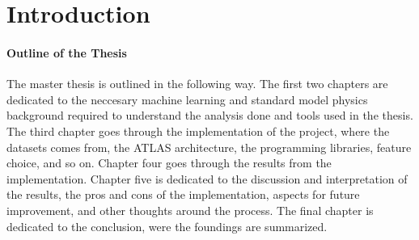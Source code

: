 \chapter*{Introduction}



\subsubsection*{Outline of the Thesis}
The master thesis is outlined in the following way. The first two chapters are dedicated to the neccesary machine learning and
standard model physics background required to understand the analysis done and tools used in the thesis. The third chapter goes 
through the implementation of the project, where the datasets comes from, the ATLAS architecture, the programming libraries, 
feature choice, and so on. Chapter four goes through the results from the implementation. Chapter five is dedicated to the discussion and 
interpretation of the results, the pros and cons of the implementation, aspects for future improvement, and other thoughts around the process.
The final chapter is dedicated to the conclusion, were the foundings are summarized. 


